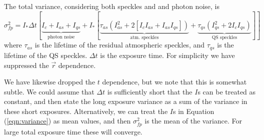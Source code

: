 \documentclass[10pt,preprint]{aastex631}
\begin{document}
The total variance, considering both speckles and and photon noise, is \citep{2007ApJ...669..642S} 
\begin{equation}
\sigma^2_{fp}  = I_* \Delta t [\underbrace{I_c + I_{as} + I_{qs}}_{\mbox{photon noise}} + I_* [ \underbrace{\tau_{as}\left(I_{as}^2 + 2[I_cI_{as} + I_{as}I_{qs}]  \right)}_{\mbox{atm. speckles}} +  \underbrace{\tau_{qs}\left( I_{qs}^2 + 2 I_c I_{qs}\right)}_{\mbox{QS speckles}}]]
\label{eqn:variance}
\end{equation}
where $\tau_{as}$ is the lifetime of the residual atmospheric speckles, and $\tau_{qs}$ is the lifetime of the QS speckles. $\Delta t$ is the exposure time.  For simplicity we have suppressed the $\vec{r}$ dependence.   

We have likewise dropped the $t$ dependence, but we note that this is somewhat subtle.  We could assume that $\Delta t$ is sufficiently short that the $I$s can be treated as constant, and then state the long exposure variance as a sum of the variance in these short exposures.  Alternatively, we can treat the $I$s in Equation (\ref{eqn:variance}) as mean values, and then $\sigma^2_{fp}$ is the mean of the variance.  For large total exposure time these will converge.
\end{document}
